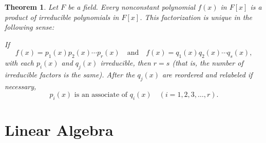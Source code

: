 \documentclass{article}
\newtheorem{theorem}{Theorem}[section]
\theoremstyle{definition}
\theoremstyle{remark}
\begin{document}
\begin{theorem} \label{thm:unique factorization}
Let $F$ be a field. Every nonconstant polynomial $f(x)$ in $F[x]$ is a product of irreducible polynomials in $F[x]$. This factorization is unique in the following sense:

If
\[
f(x) = p_1(x) p_2(x) \cdots p_r(x) \quad \text{and} \quad f(x) = q_1(x) q_2(x) \cdots q_s(x),
\]
with each $p_i(x)$ and $q_j(x)$ irreducible, then $r = s$ (that is, the number of irreducible factors is the same). After the $q_j(x)$ are reordered and relabeled if necessary,
\[
p_i(x) \text{ is an associate of } q_i(x) \quad (i = 1, 2, 3, \dots, r).
\]
\end{theorem}






\section{Linear Algebra}
\end{document}

